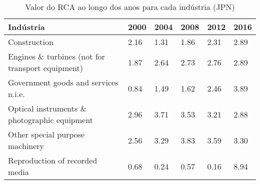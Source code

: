 \begin{table}
\centering
\caption{Valor do RCA ao longo dos anos para cada indústria (JPN)}
\begin{tabular}{p{6cm}p{1.5cm}p{1.5cm}p{1.5cm}p{1.5cm}p{1.5cm}}
\toprule
                                       Indústria & 2000 & 2004 & 2008 & 2012 & 2016 \\
\midrule
                                    Construction & 2.16 & 1.31 & 1.86 & 2.31 & 2.89 \\
Engines \& turbines (not for transport equipment) & 1.87 & 2.64 & 2.73 & 2.76 & 2.89 \\
            Government goods and services n.i.e. & 0.84 & 1.49 & 1.62 & 2.46 & 3.89 \\
    Optical instruments \& photographic equipment & 2.96 & 3.71 & 3.53 & 3.21 & 2.88 \\
                 Other special purpose machinery & 2.56 & 3.29 & 3.83 & 3.59 & 3.30 \\
                  Reproduction of recorded media & 0.68 & 0.24 & 0.57 & 0.16 & 8.94 \\
\bottomrule
\end{tabular}
\end{table}
